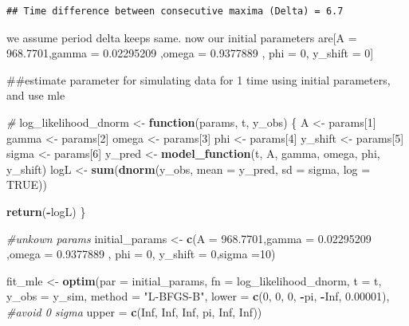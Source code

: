 \documentclass[
]{article}
\newenvironment{Shaded}{\begin{snugshade}}{\end{snugshade}}
\newcommand{\AttributeTok}[1]{\textcolor[rgb]{0.13,0.29,0.53}{#1}}
\newcommand{\CommentTok}[1]{\textcolor[rgb]{0.56,0.35,0.01}{\textit{#1}}}
\newcommand{\ConstantTok}[1]{\textcolor[rgb]{0.56,0.35,0.01}{#1}}
\newcommand{\ControlFlowTok}[1]{\textcolor[rgb]{0.13,0.29,0.53}{\textbf{#1}}}
\newcommand{\DecValTok}[1]{\textcolor[rgb]{0.00,0.00,0.81}{#1}}
\newcommand{\FloatTok}[1]{\textcolor[rgb]{0.00,0.00,0.81}{#1}}
\newcommand{\FunctionTok}[1]{\textcolor[rgb]{0.13,0.29,0.53}{\textbf{#1}}}
\newcommand{\NormalTok}[1]{#1}
\newcommand{\OtherTok}[1]{\textcolor[rgb]{0.56,0.35,0.01}{#1}}
\newcommand{\SpecialCharTok}[1]{\textcolor[rgb]{0.81,0.36,0.00}{\textbf{#1}}}
\newcommand{\StringTok}[1]{\textcolor[rgb]{0.31,0.60,0.02}{#1}}
\begin{document}
\begin{verbatim}
## Time difference between consecutive maxima (Delta) = 6.7
\end{verbatim}

we assume period delta keeps same. now our initial parameters are{[}A =
968.7701,gamma = 0.02295209 ,omega = 0.9377889 , phi = 0, y\_shift =
0{]}

\#\#estimate parameter for simulating data for 1 time using initial
parameters, and use mle

\begin{Shaded}
\begin{Highlighting}[]
\CommentTok{\# }
\NormalTok{log\_likelihood\_dnorm }\OtherTok{\textless{}{-}} \ControlFlowTok{function}\NormalTok{(params, t, y\_obs) \{}
\NormalTok{  A }\OtherTok{\textless{}{-}}\NormalTok{ params[}\DecValTok{1}\NormalTok{]}
\NormalTok{  gamma }\OtherTok{\textless{}{-}}\NormalTok{ params[}\DecValTok{2}\NormalTok{]}
\NormalTok{  omega }\OtherTok{\textless{}{-}}\NormalTok{ params[}\DecValTok{3}\NormalTok{]}
\NormalTok{  phi }\OtherTok{\textless{}{-}}\NormalTok{ params[}\DecValTok{4}\NormalTok{]}
\NormalTok{  y\_shift }\OtherTok{\textless{}{-}}\NormalTok{ params[}\DecValTok{5}\NormalTok{]}
\NormalTok{  sigma }\OtherTok{\textless{}{-}}\NormalTok{ params[}\DecValTok{6}\NormalTok{] }
\NormalTok{  y\_pred }\OtherTok{\textless{}{-}} \FunctionTok{model\_function}\NormalTok{(t, A, gamma, omega, phi, y\_shift)}
\NormalTok{  logL }\OtherTok{\textless{}{-}} \FunctionTok{sum}\NormalTok{(}\FunctionTok{dnorm}\NormalTok{(y\_obs, }\AttributeTok{mean =}\NormalTok{ y\_pred, }\AttributeTok{sd =}\NormalTok{ sigma, }\AttributeTok{log =} \ConstantTok{TRUE}\NormalTok{))}
  
  \FunctionTok{return}\NormalTok{(}\SpecialCharTok{{-}}\NormalTok{logL) }
\NormalTok{\}}

\CommentTok{\#unkown params}
\NormalTok{initial\_params }\OtherTok{\textless{}{-}} \FunctionTok{c}\NormalTok{(}\AttributeTok{A =} \FloatTok{968.7701}\NormalTok{,}\AttributeTok{gamma =} \FloatTok{0.02295209}\NormalTok{ ,}\AttributeTok{omega =} \FloatTok{0.9377889}\NormalTok{ , }\AttributeTok{phi =} \DecValTok{0}\NormalTok{, }\AttributeTok{y\_shift =} \DecValTok{0}\NormalTok{,}\AttributeTok{sigma =}\DecValTok{10}\NormalTok{)}


\NormalTok{fit\_mle }\OtherTok{\textless{}{-}} \FunctionTok{optim}\NormalTok{(}\AttributeTok{par =}\NormalTok{ initial\_params, }
                 \AttributeTok{fn =}\NormalTok{ log\_likelihood\_dnorm, }
                 \AttributeTok{t =}\NormalTok{ t, }
                 \AttributeTok{y\_obs =}\NormalTok{ y\_sim, }
                 \AttributeTok{method =} \StringTok{"L{-}BFGS{-}B"}\NormalTok{, }
                 \AttributeTok{lower =} \FunctionTok{c}\NormalTok{(}\DecValTok{0}\NormalTok{, }\DecValTok{0}\NormalTok{, }\DecValTok{0}\NormalTok{, }\SpecialCharTok{{-}}\NormalTok{pi, }\SpecialCharTok{{-}}\ConstantTok{Inf}\NormalTok{, }\FloatTok{0.00001}\NormalTok{), }\CommentTok{\#avoid 0 sigma}
                 \AttributeTok{upper =} \FunctionTok{c}\NormalTok{(}\ConstantTok{Inf}\NormalTok{, }\ConstantTok{Inf}\NormalTok{, }\ConstantTok{Inf}\NormalTok{, pi, }\ConstantTok{Inf}\NormalTok{, }\ConstantTok{Inf}\NormalTok{))}



\end{Highlighting}
\end{Shaded}
\end{document}
